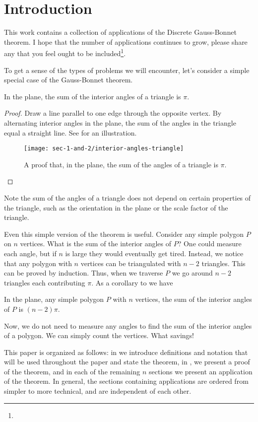 \section{Introduction}
\label{sec:intro}

This work contains a collection of applications of the 
Discrete Gauss-Bonnet theorem.
I hope that the number of applications continues to grow,
please share any that you feel
ought to  be included\footnote{}.


To get a sense of the types of problems we will encounter,
let's consider a simple special case of the Gauss-Bonnet theorem.
\begin{theorem}\label{thm:triangle}
In the plane, the sum of the interior angles of a triangle is $\pi$.
\end{theorem}
\begin{proof}
Draw a line parallel to one edge through the opposite vertex.
By alternating interior angles in the plane, the sum of the angles
in the triangle equal  a straight line.
See  for an illustration. 



\begin{figure}[htb]
\centering
\texttt{[image: sec-1-and-2/interior-angles-triangle]}
\caption{A proof that, in the plane, the sum of the angles of a triangle is $\pi$.}
\label{fig:angles}
\end{figure}

\end{proof}

Note the sum of the angles of a triangle does not
depend on certain properties of the  triangle, such as the orientation in the plane or
the scale factor of the triangle.


Even this simple version of the theorem is useful.
Consider any simple polygon $P$ on $n$ vertices. 
What is the sum of the interior angles of $P$?
One could measure each angle, but if $n$ is large they would eventually
get tired.
Instead, we notice that any polygon with $n$ vertices can be
triangulated with $n-2$ triangles. This can be proved by induction.
Thus, when we traverse $P$ we go around $n-2$ triangles each contributing
$\pi$.
As a corollary to  we have
\begin{corollary}\label{cor:angles}
In the plane, any simple polygon $P$ with $n$ vertices,
the sum of the interior angles of $P$ is $(n-2)\pi$.

\end{corollary}

Now, we do not need to measure any angles to find
the sum of  the interior angles of a polygon. We can simply
count the vertices. What savings!

This paper is organized as follows:
in  we introduce definitions and notation that will be used
throughout the paper and state the theorem,
in , we present a proof of the theorem, and in each of the remaining $n$
sections we present an application of the theorem.
In general, the sections containing applications are ordered from simpler to more technical,
and are independent of each other.


